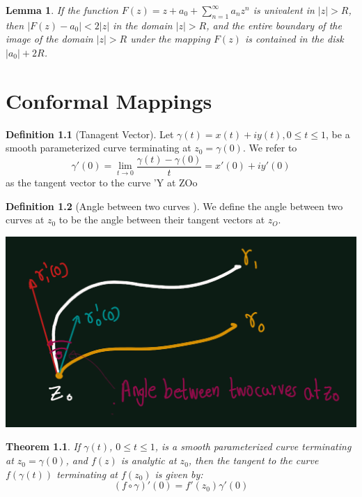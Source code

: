 \documentclass[
]{book}
\newtheorem{theorem}{Theorem}[chapter]
\newtheorem{lemma}{Lemma}[chapter]
\theoremstyle{definition}
\newtheorem{definition}{Definition}[chapter]
\theoremstyle{definition}
\theoremstyle{definition}
\theoremstyle{definition}
\theoremstyle{remark}
\begin{document}
\begin{lemma}
\protect\hypertarget{lem:unnamed-chunk-16}{}\label{lem:unnamed-chunk-16}If the function \(F(z) = z + a_0 + \sum_{n=1}^{\infty} a_n z^n\) is univalent in \(|z| > R\), then \(|F(z) - a_0| < 2|z|\) in the domain \(|z| > R\), and the entire boundary of the image of the domain \(|z| > R\) under the mapping \(F(z)\) is contained in the disk \(|a_0| + 2R\).
\end{lemma}

\chapter{Conformal Mappings}\label{conformal-mappings}

\begin{definition}[Tanagent Vector]
\protect\hypertarget{def:unnamed-chunk-17}{}\label{def:unnamed-chunk-17}Let \(\gamma(t) = x(t) + iy(t), 0\leq  t \leq  1\), be a smooth parameterized curve terminating at \(z_0 = \gamma(0)\). We refer to
\[\gamma'(0) = \lim_{t \to 0} \frac{\gamma(t)-\gamma(0)}{t} = x'(0) + iy'(0)\]
as the tangent vector to the curve 'Y at ZOo
\end{definition}

\begin{definition}[Angle between two curves ]
\protect\hypertarget{def:unnamed-chunk-18}{}\label{def:unnamed-chunk-18}We define the angle between two curves
at \(z_0\) to be the angle between their tangent vectors at \(z_O\).
\end{definition}

\includegraphics[width=19.6in]{figures/Confromal_mapping/fig1}

\begin{theorem}
\protect\hypertarget{thm:unnamed-chunk-20}{}\label{thm:unnamed-chunk-20}If \(\gamma(t)\), \(0 \leq t \leq 1\), is a smooth parameterized curve terminating at \(z_0 = \gamma(0)\), and \(f(z)\) is analytic at \(z_0\), then the tangent to the curve \(f(\gamma(t))\) terminating at \(f(z_0)\) is given by:
\begin{equation}
(f \circ \gamma)'(0) = f'(z_0)\gamma'(0)
\end{equation}
\end{theorem}
\end{document}
